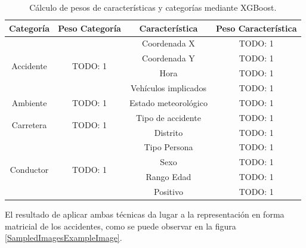   \begin{table}[H]
    \centering
    \begin{tabular}{ |c|c|c|c| }
         \hline
         \textbf{Categoría} & \textbf{Peso Categoría} & \textbf{Característica} & \textbf{Peso Característica}\\

         \hline
         \multirow{4}{*}{Accidente}   & \multirow{4}{*}{TODO: 1}      & Coordenada X          & TODO: 1\\
                                      &                               & Coordenada Y          & TODO: 1\\
                                      &                               & Hora                  & TODO: 1\\
                                      &                               & Vehículos implicados  & TODO: 1\\

         \hline
         \multirow{1}{*}{Ambiente}    & \multirow{1}{*}{TODO: 1}      & Estado meteorológico  & TODO: 1\\

         \hline
         \multirow{2}{*}{Carretera}   & \multirow{2}{*}{TODO: 1}      & Tipo de accidente     & TODO: 1\\
                                      &                               & Distrito              & TODO: 1\\

         \hline
         \multirow{4}{*}{Conductor}   & \multirow{4}{*}{TODO: 1}      & Tipo Persona          & TODO: 1\\
                                      &                               & Sexo                  & TODO: 1\\
                                      &                               & Rango Edad            & TODO: 1\\
                                      &                               & Positivo              & TODO: 1\\
         \hline
    \end{tabular}

    \caption{Cálculo de pesos de características y categorías mediante XGBoost.}
    \label{PesosFinalesCaracteristicas}
  \end{table}


  El resultado de aplicar ambas técnicas da lugar a la representación en forma matricial de los accidentes, como se puede observar en la figura \ref{SampledImagesExampleImage}.

